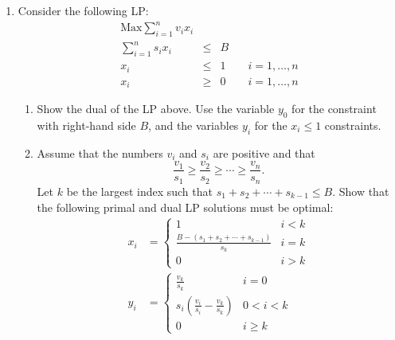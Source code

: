 \documentclass[11pt]{article}
\begin{document}
\begin{enumerate}
\item Consider the following LP:
\begin{eqnarray*}
\mbox{Max} \sum_{i=1}^n v_i x_i\\
\sum_{i=1}^n s_i x_i & \leq & B\\
x_i & \leq & 1 \qquad i = 1,\ldots, n\\
x_i & \geq & 0 \qquad i = 1,\ldots, n
\end{eqnarray*}
\begin{enumerate}
\item Show the dual of the LP above.  Use the variable $y_0$ for the constraint with right-hand side $B$, and the variables $y_i$ for the $x_i \leq 1$ constraints.
\item Assume that the numbers $v_i$ and $s_i$ are positive and that
$$\frac{v_1}{s_1} \geq \frac{v_2}{s_2} \geq \cdots \geq \frac{v_n}{s_n}.$$  Let $k$ be the largest index such that $s_1 + s_2 + \cdots + s_{k-1} \leq B$.
Show that the following primal and dual LP solutions must be optimal:
\begin{align*}
x_i & = \left\{ \begin{array}{ll}
1 & i < k\\
\frac{B-(s_1 + s_2 + \cdots + s_{k-1})}{s_k} & i = k\\
0 & i > k
\end{array} \right. \\
y_i & = \left\{ \begin{array}{ll}
\frac{v_k}{s_k} & i = 0\\
s_i \left(\frac{v_i}{s_i} - \frac{v_k}{s_k}\right) & 0 < i < k\\
0 & i \geq k
\end{array} \right.
\end{align*}
\end{enumerate}

\end{enumerate}
\end{document}
